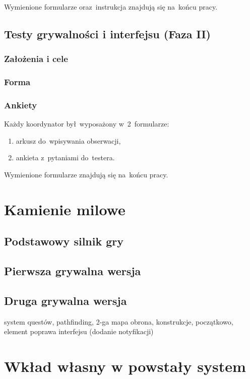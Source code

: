 \documentclass[licencjacka]{pracamgr}
\begin{document}
      \noindent
      Wymienione formularze oraz~instrukcja znajdują się na~końcu pracy.

    \section{Testy grywalności i interfejsu (Faza II)}
    
      \subsection{Założenia i cele}
      
      \subsection{Forma}
    
      \subsection{Ankiety}
      Każdy koordynator był~wyposażony w~2~formularze:
      \begin{enumerate}
	\item arkusz do~wpisywania obserwacji,
	\item ankieta z~pytaniami do~testera.
      \end{enumerate}
      
      \noindent
      Wymienione formularze znajdują się na~końcu pracy.

\chapter{Kamienie milowe}
  \section{Podstawowy silnik gry}
  
  \section{Pierwsza grywalna wersja}
  
  \section{Druga grywalna wersja}
  system questów,
  pathfinding,
  2-ga mapa obrona, konstrukcje, początkowo, element
  poprawa interfejsu (dodanie notyfikacji)

\chapter{Wkład własny w powstały system}
\end{document}
